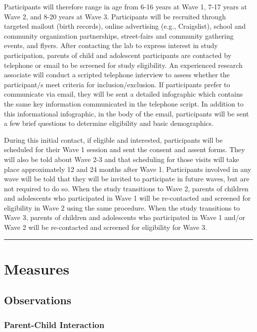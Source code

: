 \documentclass[
]{book}
\begin{document}
Participants will therefore range in age from 6-16 years at Wave 1, 7-17 years at Wave 2, and 8-20 years at Wave 3. Participants will be recruited through targeted mailout (birth records), online advertising (e.g., Craigslist), school and community organization partnerships, street-fairs and community gathering events, and flyers. After contacting the lab to express interest in study participation, parents of child and adolescent participants are contacted by telephone or email to be screened for study eligibility. An experienced research associate will conduct a scripted telephone interview to assess whether the participant/s meet criteria for inclusion/exclusion. If participants prefer to communicate via email, they will be sent a detailed infographic which contains the same key information communicated in the telephone script. In addition to this informational infographic, in the body of the email, participants will be sent a few brief questions to determine eligibility and basic demographics.

During this initial contact, if eligible and interested, participants will be scheduled for their Wave 1 session and sent the consent and assent forms. They will also be told about Wave 2-3 and that scheduling for those visits will take place approximately 12 and 24 months after Wave 1. Participants involved in any wave will be told that they will be invited to participate in future waves, but are not required to do so. When the study transitions to Wave 2, parents of children and adolescents who participated in Wave 1 will be re-contacted and screened for eligibility in Wave 2 using the same procedure. When the study transitions to Wave 3, parents of children and adolescents who participated in Wave 1 and/or Wave 2 will be re-contacted and screened for eligibility for Wave 3.

\begin{center}\rule{0.5\linewidth}{0.5pt}\end{center}

\hypertarget{measures}{%
\section{Measures}\label{measures}}

\hypertarget{observations}{%
\subsection{Observations}\label{observations}}

\hypertarget{parent-child-interaction}{%
\subsubsection{Parent-Child Interaction}\label{parent-child-interaction}}
\end{document}
